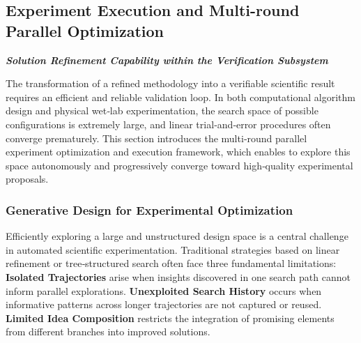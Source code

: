 \subsection{Experiment Execution and Multi-round Parallel Optimization}
\vspace{-0.5em}
{\raggedleft \normalsize \color{gray} \textbf{\textit{Solution Refinement Capability within the Verification Subsystem}}\par}

\label{sec:optim_method}

The transformation of a refined methodology into a verifiable scientific result requires an efficient and reliable validation loop. In both computational algorithm design and physical wet‑lab experimentation, the search space of possible configurations is extremely large, and linear trial‑and‑error procedures often converge prematurely. This section introduces the multi‑round parallel experiment optimization and execution framework, which enables {\ProjectName} to explore this space autonomously and progressively converge toward high‑quality experimental proposals.

\subsubsection{Generative Design for Experimental Optimization}

Efficiently exploring a large and unstructured design space is a central challenge in automated scientific experimentation. Traditional strategies \cite{aider, automind} based on linear refinement or tree‑structured search often face three fundamental limitations: %
\textbf{Isolated Trajectories} arise when insights discovered in one search path cannot inform parallel explorations.
\textbf{Unexploited Search History} occurs when informative patterns across longer trajectories are not captured or reused.
\textbf{Limited Idea Composition} restricts the integration of promising elements from different branches into improved solutions.

